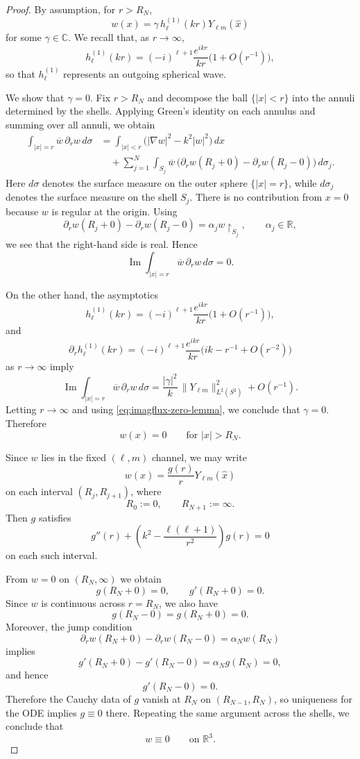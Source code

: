\documentclass[a4paper,11pt]{article}
\numberwithin{equation}{section}
\newcommand{\R}{\mathbb{R}}
\newcommand{\C}{\mathbb{C}}
\newcommand{\hj}[1]{h^{(1)}_{#1}}
\renewcommand{\Im}{\operatorname{Im}}
\theoremstyle{definition}
\theoremstyle{remark}
\begin{document}
\begin{proof}
By assumption, for $r>R_N$,
$$
w(x)=\gamma\,\hj{\ell}(kr)Y_{\ell m}(\widehat x)
$$
for some $\gamma\in\C$.
We recall that, as $r\to\infty$,
$$
h_\ell^{(1)}(kr)
=
(-i)^{\ell+1}\frac{e^{ikr}}{kr}\bigl(1+O(r^{-1})\bigr),
$$
so that $h_\ell^{(1)}$ represents an outgoing spherical wave.

We show that $\gamma=0$.
Fix $r>R_N$ and decompose the ball $\{|x|<r\}$ into
the annuli determined by the shells.
Applying Green's identity on each annulus and summing over all annuli, we obtain
\begin{align*}
\int_{|x|=r}\overline{w}\,\partial_r w\,d\sigma
&=
\int_{|x|<r}\bigl(|\nabla w|^2-k^2|w|^2\bigr)\,dx
\\
&\quad
+
\sum_{j=1}^N
\int_{S_j}\overline{w}\,
\bigl(
\partial_r w(R_j+0)-\partial_r w(R_j-0)
\bigr)\,d\sigma_j.
\end{align*}
Here $d\sigma$ denotes the surface measure on the outer sphere $\{|x|=r\}$,
while $d\sigma_j$ denotes the surface measure on the shell $S_j$.
There is no contribution from $x=0$ because $w$ is regular at the origin.
Using
\[
\partial_r w(R_j+0)-\partial_r w(R_j-0)=\alpha_j w\upharpoonright_{S_j},
\qquad \alpha_j\in\R,
\]
we see that the right-hand side is real. Hence
\begin{equation}\label{eq:imagflux-zero-lemma}
\Im \int_{|x|=r}\overline{w}\,\partial_r w\,d\sigma =0.
\end{equation}

On the other hand, the asymptotics
\[
\hj{\ell}(kr)
=
(-i)^{\ell+1}\frac{e^{ikr}}{kr}\bigl(1+O(r^{-1})\bigr),
\]
and
\[
\partial_r\hj{\ell}(kr)
=
(-i)^{\ell+1}\frac{e^{ikr}}{kr}
\bigl(ik-r^{-1}+O(r^{-2})\bigr)
\]
as $r\to\infty$ imply
\[
\Im \int_{|x|=r}\overline{w}\,\partial_r w\,d\sigma
=
\frac{|\gamma|^2}{k}\,\|Y_{\ell m}\|_{L^2(S^2)}^2
+
O(r^{-1}).
\]
Letting $r\to\infty$ and using \eqref{eq:imagflux-zero-lemma}, we conclude
that $\gamma=0$. Therefore
\[
w(x)=0
\qquad \text{for }|x|>R_N.
\]

Since $w$ lies in the fixed $(\ell,m)$ channel, we may write
\[
w(x)=\frac{g(r)}{r}Y_{\ell m}(\widehat x)
\]
on each interval $(R_j,R_{j+1})$, where
\[
R_0:=0,
\qquad
R_{N+1}:=\infty.
\]
Then $g$ satisfies
\[
g''(r)+\left(k^2-\frac{\ell(\ell+1)}{r^2}\right)g(r)=0
\]
on each such interval.

From $w=0$ on $(R_N,\infty)$ we obtain
\[
g(R_N+0)=0,
\qquad
g'(R_N+0)=0.
\]
Since $w$ is continuous across $r=R_N$, we also have
\[
g(R_N-0)=g(R_N+0)=0.
\]
Moreover, the jump condition
\[
\partial_r w(R_N+0)-\partial_r w(R_N-0)=\alpha_N w(R_N)
\]
implies
\[
g'(R_N+0)-g'(R_N-0)=\alpha_N g(R_N)=0,
\]
and hence
\[
g'(R_N-0)=0.
\]
Therefore the Cauchy data of $g$ vanish at $R_N$ on $(R_{N-1},R_N)$, so
uniqueness for the ODE implies $g\equiv0$ there. Repeating the same argument
across the shells, we conclude that
\[
w\equiv0
\qquad \text{on }\R^3.
\]
\end{proof}
\end{document}
